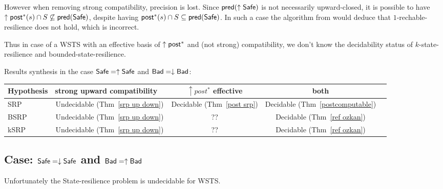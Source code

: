 %
%



However when removing strong compatibility, precision is lost.
Since $\textsf{pred}(\uparrow \textsf{Safe})$ is not necessarily upward-closed, it is possible to have 
 $\uparrow \textsf{post}^* (s) \cap S \not\subseteq \textsf{pred}(\textsf{Safe})$,
despite having 
$\textsf{post}^* (s) \cap S \subseteq \textsf{pred}( \textsf{Safe})$.
In such a case the algorithm from
\cite{DBLP:conf/gg/Ozkan22} would deduce that $1$-rechable-resilience does not hold,
which is incorrect.

Thus in case of a WSTS with an effective basis of $\uparrow \textsf{post}^*$ and (not strong) compatibility, we don't know the decidability status of {\sc $k$-state-resilience} and 
{\sc bounded-state-resilience}. 


Results synthesis in the case $\textsf{Safe} = \uparrow \textsf{Safe}$ and $\textsf{Bad} = \downarrow \textsf{Bad}$:


\begin{center}
\begin{tabular}{ | l | c | c | c | c |}
\hline  Hypothesis & strong upward compatibility ~ & $\uparrow post^*$ effective & both  \\ \hline
   SRP & Undecidable (Thm~\ref{srp up down}) & Decidable (Thm~\ref{post srp})  & Decidable (Thm~\ref{postcomputable})\\ \hline
   BSRP & Undecidable (Thm~\ref{srp up down}) &  ??  & Decidable (Thm~\ref{ref ozkan}) \\ \hline
      kSRP & Undecidable (Thm~\ref{srp up down}) & ?? & Decidable (Thm~\ref{ref ozkan}) \\ \hline
 \end{tabular}
\end{center}


\subsection{Case: $\textsf{Safe} = \downarrow \textsf{Safe}$ and $\textsf{Bad} = \uparrow \textsf{Bad}$}



Unfortunately the {\sc State-resilience} problem is undecidable for WSTS.

